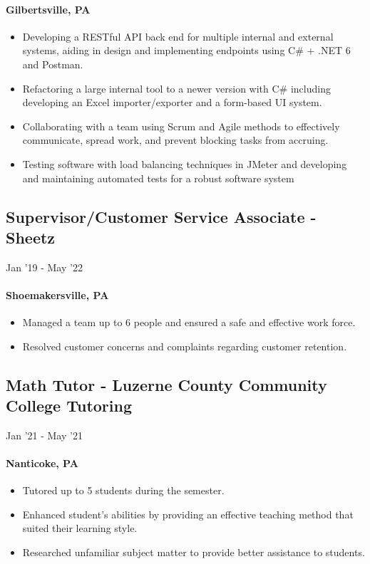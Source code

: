 \documentclass{article}
\begin{document}
\paragraph{Gilbertsville, PA}

\begin{itemize}
    \item Developing a RESTful API back end for multiple internal and external systems, aiding in design and implementing endpoints using C\# + .NET 6 and Postman.
    \item Refactoring a large internal tool to a newer version with C\# including developing an Excel importer/exporter and a form-based UI system.
    \item Collaborating with a team using Scrum and Agile methods to effectively communicate, spread work, and prevent blocking tasks from accruing.
    \item Testing software with load balancing techniques in JMeter and developing and maintaining automated tests for a robust software system
\end{itemize}

\subsection{Supervisor/Customer Service Associate - Sheetz} \hfill Jan '19 - May '22
\paragraph{Shoemakersville, PA}
\begin{itemize}
  \item Managed a team up to 6 people and ensured a safe and effective work force.
  \item Resolved customer concerns and complaints regarding customer retention.
\end{itemize}

\subsection{Math Tutor - Luzerne County Community College Tutoring} \hfill Jan '21 - May '21
\paragraph{Nanticoke, PA}
\begin{itemize}
  \item Tutored up to 5 students during the semester.
  \item Enhanced student’s abilities by providing an effective teaching method that suited their learning style.
  \item Researched unfamiliar subject matter to provide better assistance to students.
\end{itemize}
\end{document}
